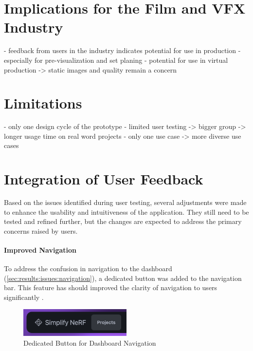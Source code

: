 \section{Implications for the Film and VFX Industry}
\label{sec:discussion:implications}

- feedback from users in the industry indicates potential for use in production
- especially for pre-visualization and set planing
- potential for use in virtual production -> static images and quality remain a concern

\section{Limitations}
\label{sec:discussion:limitations}

- only one design cycle of the prototype
- limited user testing -> bigger group -> longer usage time on real word projects
- only one use case -> more diverse use cases

\section{Integration of User Feedback}
\label{sec:discussion:user-feedback}

Based on the issues identified during user testing, several adjustments were made to enhance the usability and intuitiveness of the application.
They still need to be tested and refined further, but the changes are expected to address the primary concerns raised by users.

\paragraph{Improved Navigation}
To address the confusion in navigation to the dashboard (\ref{sec:results:issues:navigation}), a dedicated button was added to the navigation bar.
This feature has should improved the clarity of  navigation to users significantly .

\begin{figure}[htb]
  \centering
	\includegraphics[width=0.5\textwidth]{figures/fix-1.png}
	\caption{Dedicated Button for Dashboard Navigation}
  \label{fig:fix-1}
\end{figure}

